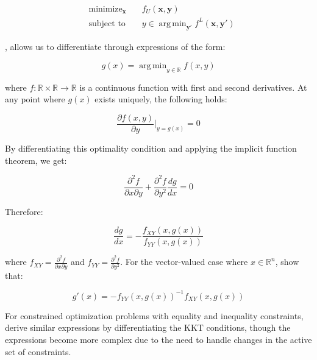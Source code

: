 \documentclass{article}
\DeclareMathOperator*{\argmin}{arg\,min}
\begin{document}
\begin{equation}
\begin{aligned}
    &\text{minimize}_\mathbf{x}  \quad & f_U(\mathbf{x}, \mathbf{y})\\
    &\text{subject to} \quad & y \in \argmin_{\mathbf{y'}} f^L(\mathbf{x},\mathbf{y'})
\end{aligned}
\end{equation}





\newpage
, allows us to differentiate through expressions of the form:

\begin{equation}
g(x) = \argmin_{y \in \mathbb{R}} f(x,y)
\end{equation}

where $f: \mathbb{R} \times \mathbb{R} \to \mathbb{R}$ is a continuous function with first and second derivatives. At any point where $g(x)$ exists uniquely, the following holds:

\begin{equation}
\frac{\partial f(x,y)}{\partial y}\bigg|_{y=g(x)} = 0
\end{equation}

By differentiating this optimality condition and applying the implicit function theorem, we get:

\begin{equation}
\frac{\partial^2 f}{\partial x \partial y} + \frac{\partial^2 f}{\partial y^2} \frac{dg}{dx} = 0
\end{equation}

Therefore:

\begin{equation}
\frac{dg}{dx} = -\frac{f_{XY}(x,g(x))}{f_{YY}(x,g(x))}
\end{equation}

where $f_{XY} = \frac{\partial^2 f}{\partial x \partial y}$ and $f_{YY} = \frac{\partial^2 f}{\partial y^2}$. For the vector-valued case where $x \in \mathbb{R}^n$, \citep{gould2016differentiating} show that:

\begin{equation}
g'(x) = -f_{YY}(x,g(x))^{-1}f_{XY}(x,g(x))
\end{equation}

For constrained optimization problems with equality and inequality constraints, \citep{gould2016differentiating} derive similar expressions by differentiating the KKT conditions, though the expressions become more complex due to the need to handle changes in the active set of constraints.
\end{document}
